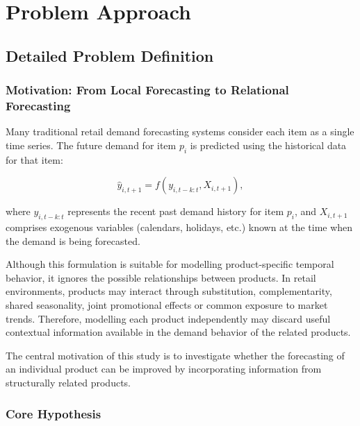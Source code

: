 \chapter{Problem Approach}
\label{Detailed Problem Definition}
\section{Detailed Problem Definition}
\label{sec:detailed_problem_definition}

\subsection{Motivation: From Local Forecasting to Relational Forecasting}
\label{subsec:motivation_local_relational}

Many traditional retail demand forecasting systems consider each item as a single time series. The future demand for item \( p_i \) is predicted using the historical data for that item:

\begin{equation}
    \hat{y}_{i,t+1} = f\left(y_{i,t-k:t}, X_{i,t+1}\right),
    \label{eq:local_forecasting}
\end{equation}

where \( y_{i,t-k:t} \) represents the recent past demand history for item \( p_i \), and \( X_{i,t+1} \) comprises exogenous variables (calendars, holidays, etc.) known at the time when the demand is being forecasted.

Although this formulation is suitable for modelling product-specific temporal behavior, it ignores the possible relationships between products. In retail environments, products may interact through substitution, complementarity, shared seasonality, joint promotional effects or common exposure to market trends. Therefore, modelling each product independently may discard useful contextual information available in the demand behavior of the related products.

The central motivation of this study is to investigate whether the forecasting of an individual product can be improved by incorporating information from structurally related products.

\subsection{Core Hypothesis}
\label{subsec:core_hypothesis}

